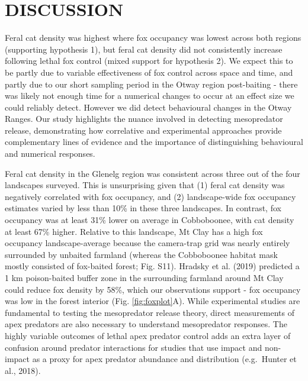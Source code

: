 \documentclass[]{elsarticle} %
\begin{document}
\newpage

\hypertarget{discussion}{%
\section{DISCUSSION}\label{discussion}}

Feral cat density was highest where fox occupancy was lowest across both regions (supporting hypothesis 1), but feral cat density did not consistently increase following lethal fox control (mixed support for hypothesis 2). We expect this to be partly due to variable effectiveness of fox control across space and time, and partly due to our short sampling period in the Otway region post-baiting - there was likely not enough time for a numerical changes to occur at an effect size we could reliably detect. However we did detect behavioural changes in the Otway Ranges. Our study highlights the nuance involved in detecting mesopredator release, demonstrating how correlative and experimental approaches provide complementary lines of evidence and the importance of distinguishing behavioural and numerical responses.

Feral cat density in the Glenelg region was consistent across three out of the four landscapes surveyed. This is unsurprising given that (1) feral cat density was negatively correlated with fox occupancy, and (2) landscape-wide fox occupancy estimates varied by less than 10\% in these three landscapes. In contrast, fox occupancy was at least 31\% lower on average in Cobboboonee, with cat density at least 67\% higher. Relative to this landscape, Mt Clay has a high fox occupancy landscape-average because the camera-trap grid was nearly entirely surrounded by unbaited farmland (whereas the Cobboboonee habitat mask mostly consisted of fox-baited forest; Fig. S11). Hradsky et al. (2019) predicted a 1 km poison-baited buffer zone in the surrounding farmland around Mt Clay could reduce fox density by 58\%, which our observations support - fox occupancy was low in the forest interior (Fig. \ref{fig:foxplot}A). While experimental studies are fundamental to testing the mesopredator release theory, direct measurements of apex predators are also necessary to understand mesopredator responses. The highly variable outcomes of lethal apex predator control adds an extra layer of confusion around predator interactions for studies that use impact and non-impact as a proxy for apex predator abundance and distribution (e.g.~Hunter et al., 2018).
\end{document}
